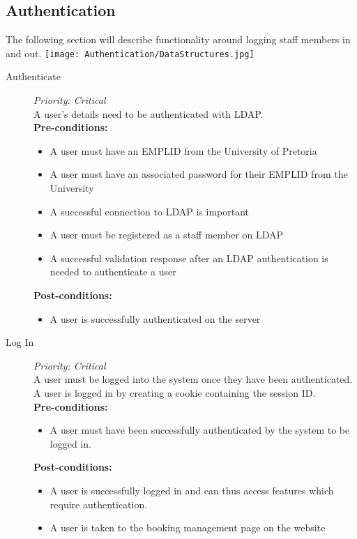 \newpage
\subsection{Authentication}
	The following section will describe functionality around logging staff members in and out.
		\texttt{[image: Authentication/DataStructures.jpg]}

	\begin{description}

	\item[Authenticate]\hfill \textit{Priority: Critical} \\
		A user's details need to be authenticated with LDAP.\\
		\textbf{Pre-conditions:} 
			\begin{itemize}
				\item A user must have an EMPLID from the University of Pretoria 
				\item A user must have an associated password for their EMPLID from the University
				\item A successful connection to LDAP is important
				\item A user must be registered as a staff member on LDAP
				\item A successful validation response after an LDAP authentication is needed to authenticate a user
			\end{itemize}
		\textbf{Post-conditions:} 
			\begin{itemize}
				\item A user is successfully authenticated on the server
			\end{itemize}
		
	\item[Log In]\hfill \textit{Priority: Critical} \\
		A user must be logged into the system once they have been authenticated. A user is logged in by 
		creating a cookie containing the session ID. \\
		\textbf{Pre-conditions:} 
			\begin{itemize}
				\item A user must have been successfully authenticated by the system to be logged in.
			\end{itemize}
		\textbf{Post-conditions:} 
			\begin{itemize}
				\item A user is successfully logged in and can thus access features which require authentication.
				\item A user is taken to the booking management page on the website
			\end{itemize}


\end{description}
